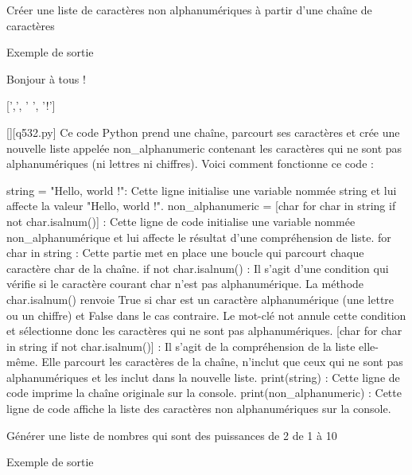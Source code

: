         \question
        Créer une liste de caractères non alphanumériques à partir d'une chaîne de caractères

Exemple de sortie

Bonjour à tous !

[',', ' ', '!']
        \par
        \begin{solution}
            \renewcommand{\nomfichier}{q532.py}
            \pythonfile{\chemincode \nomfichier}[][\nomfichier]
            Ce code Python prend une chaîne, parcourt ses caractères et crée une nouvelle liste appelée non_alphanumeric contenant les caractères qui ne sont pas alphanumériques (ni lettres ni chiffres). Voici comment fonctionne ce code :

    string = "Hello, world !": Cette ligne initialise une variable nommée string et lui affecte la valeur "Hello, world !".
    non_alphanumeric = [char for char in string if not char.isalnum()] : Cette ligne de code initialise une variable nommée non_alphanumérique et lui affecte le résultat d'une compréhension de liste.
        for char in string : Cette partie met en place une boucle qui parcourt chaque caractère char de la chaîne.
        if not char.isalnum() : Il s'agit d'une condition qui vérifie si le caractère courant char n'est pas alphanumérique. La méthode char.isalnum() renvoie True si char est un caractère alphanumérique (une lettre ou un chiffre) et False dans le cas contraire. Le mot-clé not annule cette condition et sélectionne donc les caractères qui ne sont pas alphanumériques.
        [char for char in string if not char.isalnum()] : Il s'agit de la compréhension de la liste elle-même. Elle parcourt les caractères de la chaîne, n'inclut que ceux qui ne sont pas alphanumériques et les inclut dans la nouvelle liste.
    print(string) : Cette ligne de code imprime la chaîne originale sur la console.
    print(non_alphanumeric) : Cette ligne de code affiche la liste des caractères non alphanumériques sur la console.
        \end{solution}
        

        \question
        Générer une liste de nombres qui sont des puissances de 2 de 1 à 10

Exemple de sortie

